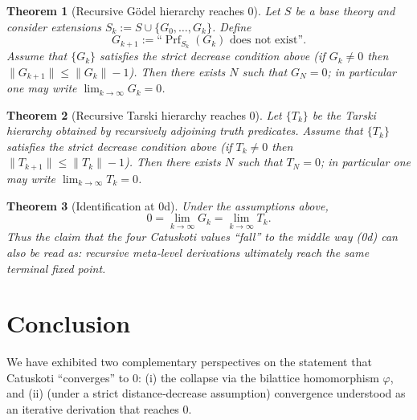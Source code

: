 \documentclass[12pt,a4paper]{article}
\newcommand{\dfix}{\mathfrak{0}}          %
\newcommand{\phiMap}{\varphi}            %
\newtheorem{theorem}{Theorem}[section]
\begin{document}
\begin{theorem}[Recursive G\"odel hierarchy reaches $\dfix$]
Let $S$ be a base theory and consider extensions $S_k:=S\cup\{G_0,\dots,G_k\}$.
Define
\[
  G_{k+1}:=\text{``}\operatorname{Prf}_{S_k}(G_k)\text{ does not exist''}.
\]
Assume that $\{G_k\}$ satisfies the strict decrease condition above (if $G_k\neq\dfix$ then $\|G_{k+1}\|\le \|G_k\|-1$).
Then there exists $N$ such that $G_N=\dfix$; in particular one may write $\lim_{k\to\infty}G_k=\dfix$.
\end{theorem}

\begin{theorem}[Recursive Tarski hierarchy reaches $\dfix$]
Let $\{T_k\}$ be the Tarski hierarchy obtained by recursively adjoining truth predicates.
Assume that $\{T_k\}$ satisfies the strict decrease condition above (if $T_k\neq\dfix$ then $\|T_{k+1}\|\le \|T_k\|-1$).
Then there exists $N$ such that $T_N=\dfix$; in particular one may write $\lim_{k\to\infty}T_k=\dfix$.
\end{theorem}

\begin{theorem}[Identification at $0$d]
Under the assumptions above,
\[
\dfix
= \lim_{k \to \infty} G_k
= \lim_{k \to \infty} T_k.
\]
Thus the claim that the four Catuskoti values ``fall'' to the middle way (0d) can also be read as:
recursive meta‑level derivations ultimately reach the same terminal fixed point.
\end{theorem}

\section{Conclusion}

We have exhibited two complementary perspectives on the statement that Catuskoti ``converges'' to $\dfix$:
(i) the collapse via the bilattice homomorphism $\phiMap$, and
(ii) (under a strict distance‑decrease assumption) convergence understood as an iterative derivation that reaches $\dfix$.
\end{document}
